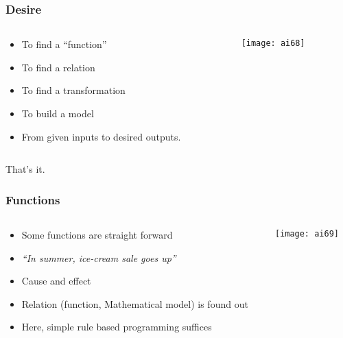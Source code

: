 \begin{frame}[fragile]\frametitle{Desire}

\begin{columns}
    \begin{column}[T]{0.6\linewidth}

\begin{itemize}
\item To find a ``function''
\item To find a relation
\item To find a transformation
\item To build a model
\item From given inputs to desired outputs.
\end{itemize}

    \end{column}
    \begin{column}[T]{0.4\linewidth}

			\begin{center}
			\texttt{[image: ai68]}
			\end{center}
			
    \end{column}
  \end{columns}
  
That's it.
\end{frame}

\begin{frame}[fragile]\frametitle{Functions}

\begin{columns}
    \begin{column}[T]{0.6\linewidth}

\begin{itemize}
\item Some functions are straight forward
\item {\em ``In summer, ice-cream sale goes up''}
\item Cause and effect
\item Relation (function, Mathematical model) is found out
\item Here, simple rule based programming suffices
\end{itemize}

    \end{column}
    \begin{column}[T]{0.4\linewidth}

			\begin{center}
			\texttt{[image: ai69]}
			\end{center}
			
    \end{column}
  \end{columns}
  

\end{frame}

